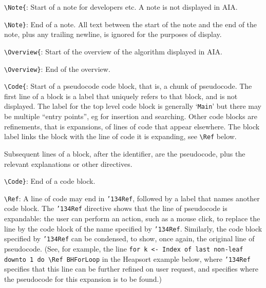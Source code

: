 \documentclass[11pt]{article}
\newcommand{\slant}{\texttt{\char'134}}        %
\begin{document}
\begin{description}

\item{\verb~\Note{~:}
Start of a note for developers etc. A note is not displayed in AIA.

\item{\verb~\Note}~:}
End of a note. All text between the start of the note and the end of the note, 
plus any trailing newline, is ignored for the purposes of display.

\item{\verb~\Overview{~:}
Start of the overview of the algorithm displayed in AIA.

\item{\verb~\Overview}~:}
End of the overview.

\item{\verb~\Code{~:}
Start of a pseudocode code block, that is, a chunk of pseudocode. 
The first line of a block is a label that uniquely refers to that block, 
and is not displayed. 
The label for the top level code block is generally `\texttt{Main}' but
there may be multiple ``entry points'', eg for insertion and searching. 
Other code blocks are refinements, that is expansions, of lines of code 
that appear elsewhere. 
The block label links the block with the line of code it is expanding, 
see {\tt \textbackslash Ref} below.  
 
Subsequent lines of a block, after the identifier, are the pseudocode, 
plus the relevant explanations or other directives.

\item{\verb~\Code}~:}
End of a code block.

\item{\verb~\Ref~:}
A line of code may end in \texttt{\slant}\texttt{Ref},
followed by a label that names another code block.
The  \texttt{\slant}\texttt{Ref} directive shows that the line of pseudocode is 
expandable: the user can perform an action, such as a mouse click, to replace 
the line by the code block of the name specified by 
\texttt{\slant}\texttt{Ref}.
Similarly, the code block specified by \texttt{\slant}\texttt{Ref} can be 
condensed, to show, once again, the original line of pseudocode. 
(See, for example, the line 
{\tt for k <- Index of last non-leaf downto 1 do \textbackslash Ref BHForLoop} 
in the Heapsort example below, where \texttt{\slant}\texttt{Ref} specifies 
that this line can be further refined on user request, and specifies where 
the pseudocode for this expansion is to be found.)


\end{description}
\end{document}
